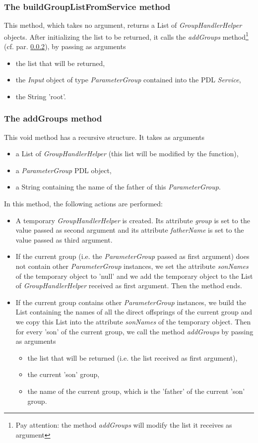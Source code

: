 \documentclass[a4paper,11pt] {ivoa}
\begin{document}
\subsubsection{The buildGroupListFromService method}\label{buildGroupListFromService}
This method, which takes no argument, returns a List of {\it GroupHandlerHelper} objects. After initializing the list to be returned, it calls the 
{\it addGroups} method\footnote{Pay attention: the method {\it addGroups} will modify the list it receives as argument} (cf. par. \ref{addGroups}), by passing as arguments 
\begin{itemize}
\item the list that will be returned, 
\item the {\it Input} object of type {\it ParameterGroup} contained into the PDL {\it Service},
\item the String 'root'.
\end{itemize}

\subsubsection{The addGroups method}\label{addGroups}
This void method has a recursive structure. It takes as arguments 
\begin{itemize}
\item a List of {\it GroupHandlerHelper} (this list will be modified by the function),
\item a {\it ParameterGroup} PDL object,
\item a String containing the name of the father of this {\it ParameterGroup}.
\end{itemize}
In this method, the following actions are performed:
\begin{itemize}
\item A temporary {\it GroupHandlerHelper} is created. Its attribute {\it group} is set to the value passed as second argument and its attribute {\it fatherName} is set to the value passed as third argument.
\item If the current group (i.e. the {\it ParameterGroup} passed as first argument) does not contain other {\it ParameterGroup} instances, we set the attribute {\it sonNames} of the temporary object to 'null' and we add the temporary object to the List of {\it GroupHandlerHelper} received as first argument. Then the method ends.
\item If the current group contains other {\it ParameterGroup} instances, we build the List containing the names of all the direct offsprings of the current group and we copy this List into the attribute {\it sonNames} of the temporary object. Then for every 'son' of the current group, we call the method {\it addGroups} by passing as arguments
\begin{itemize}
\item the list that will be returned (i.e. the list received as first argument),
\item the current 'son' group,
\item the name of the current group, which is the 'father' of the current 'son' group.
\end{itemize}
\end{itemize}
\end{document}
